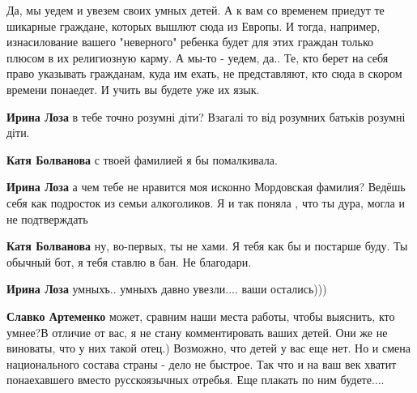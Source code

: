 \begin{itemize}


Да, мы уедем и увезем своих умных детей. А к вам со временем приедут те
шикарные граждане, которых вышлют сюда из Европы. И тогда, например,
изнасилование вашего "неверного" ребенка будет для этих граждан только плюсом в
их религиозную карму. А мы-то - уедем, да.. Те, кто берет на себя право
указывать гражданам, куда им ехать, не представляют, кто сюда в скором времени
понаедет. И учить вы будете уже их язык.\Smiley[1.0][yellow]

\begin{itemize}

\textbf{Ирина Лоза} в тебе точно розумні діти? Взагалі то від розумних батьків розумні діти.


\textbf{Катя Болванова} с твоей фамилией я бы помалкивала.\Smiley[1.0][yellow]


\textbf{Ирина Лоза} а чем тебе не нравится моя исконно Мордовская фамилия? Ведёшь себя как подросток из семьи алкоголиков. Я и так поняла , что ты дура, могла и не подтверждать


\textbf{Катя Болванова} ну, во-первых, ты не хами. Я тебя как бы и постарше буду. Ты обычный бот, я тебя ставлю в бан. Не благодари.\Smiley[1.0][yellow]


\textbf{Ирина Лоза} умныхъ.. умныхъ давно увезли.... ваши остались)))


\textbf{Славко Артеменко} может, сравним наши места работы, чтобы выяснить, кто
умнее?\Smiley[1.0][yellow] В отличие от вас, я не стану комментировать ваших детей. Они же не
виноваты, что у них такой отец.) Возможно, что детей у вас еще нет. Но и смена
национального состава страны - дело не быстрое. Так что и на ваш век хватит
понаехавшего вместо русскоязычных отребья. Еще плакать по ним будете....
\end{itemize}


\end{itemize}
